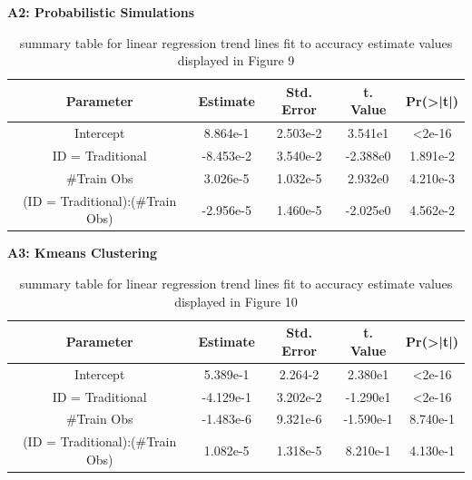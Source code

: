 \documentclass[12pt,]{article}
\begin{document}
\textbf{A2: Probabilistic Simulations}

\begin{table}[h!]
\begin{center}
\begin{tabular}{|c|c|c|c|c|}
\hline
Parameter                      & Estimate  & Std. Error & t. Value  & Pr(>|t|) \\
\hline
\hline
Intercept                      &  8.864e-1 &  2.503e-2  &  3.541e1  & <2e-16   \\
\hline
ID = Traditional               & -8.453e-2 &  3.540e-2  & -2.388e0  & 1.891e-2 \\
\hline
\#Train Obs                    &  3.026e-5 &  1.032e-5  &  2.932e0  & 4.210e-3 \\
\hline
(ID = Traditional):(\#Train Obs) &  -2.956e-5 &  1.460e-5  &  -2.025e0 & 4.562e-2 \\
\hline
\end{tabular}
\end{center}
\caption[A2: Probabilistic Simulation Regression Summary Tables]{summary table for linear regression trend lines fit to accuracy estimate values displayed in Figure 9}
\end{table}

\textbf{A3: Kmeans Clustering}

\begin{table}[h!]
\begin{center}
\begin{tabular}{|c|c|c|c|c|}
\hline
Parameter                      & Estimate  & Std. Error & t. Value  & Pr(>|t|) \\
\hline
\hline
Intercept                      &  5.389e-1 &  2.264-2  &  2.380e1  & <2e-16   \\
\hline
ID = Traditional               & -4.129e-1 &  3.202e-2  & -1.290e1  & <2e-16 \\
\hline
\#Train Obs                    &  -1.483e-6 &  9.321e-6  &  -1.590e-1  & 8.740e-1 \\
\hline
(ID = Traditional):(\#Train Obs) &  1.082e-5 &  1.318e-5  &  8.210e-1 & 4.130e-1 \\
\hline
\end{tabular}
\end{center}
\caption[A3: Kmeans Clustering Regression Summary Tables]{summary table for linear regression trend lines fit to accuracy estimate values displayed in Figure 10}
\end{table}

\newpage
\end{document}
